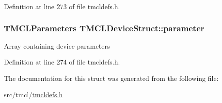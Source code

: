 Definition at line 273 of file tmcldefs.h.\hypertarget{structTMCLDeviceStruct_a95bdba1d9decf882fd8a03b2b2b08373}{
\subsubsection[{parameter}]{\setlength{\rightskip}{0pt plus 5cm}TMCLParameters {\bf TMCLDeviceStruct::parameter}}}
\label{structTMCLDeviceStruct_a95bdba1d9decf882fd8a03b2b2b08373}
Array containing device parameters 

Definition at line 274 of file tmcldefs.h.

The documentation for this struct was generated from the following file:\begin{DoxyCompactItemize}
\item 
src/tmcl/\hyperlink{tmcldefs_8h}{tmcldefs.h}\end{DoxyCompactItemize}
